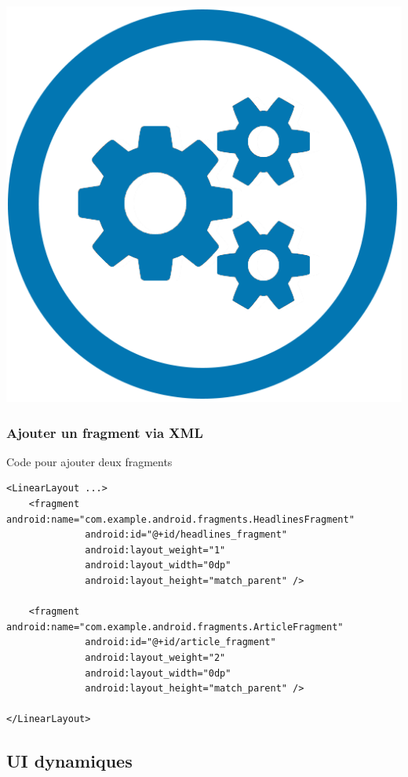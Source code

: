 \documentclass{beamer}
\begin{document}
\begin{frame}
\begin{center}
\includegraphics[scale=0.05]{api.png}
\end{center}
\end{frame}

\begin{frame}[fragile]
\frametitle{Ajouter un fragment via XML}
\begin{block}{Code pour ajouter deux fragments}
\lstset{language=xml}
\begin{lstlisting}
<LinearLayout ...>
    <fragment android:name="com.example.android.fragments.HeadlinesFragment"
              android:id="@+id/headlines_fragment"
              android:layout_weight="1"
              android:layout_width="0dp"
              android:layout_height="match_parent" />

    <fragment android:name="com.example.android.fragments.ArticleFragment"
              android:id="@+id/article_fragment"
              android:layout_weight="2"
              android:layout_width="0dp"
              android:layout_height="match_parent" />

</LinearLayout>

\end{lstlisting}
\end{block}
\end{frame}

\subsection{UI dynamiques}
\end{document}
